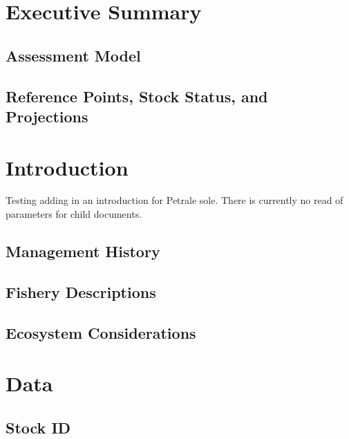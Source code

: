 \documentclass[
]{scrartcl}
\begin{document}
\newpage{}

\section{Executive Summary}\label{executive-summary}

\subsection{Assessment Model}\label{assessment-model}

\subsection{Reference Points, Stock Status, and
Projections}\label{reference-points-stock-status-and-projections}

\newpage{}

\section{Introduction}\label{introduction}

Testing adding in an introduction for Petrale sole. There is currently
no read of parameters for child documents.

\subsection{Management History}\label{management-history}

\subsection{Fishery Descriptions}\label{fishery-descriptions}

\subsection{Ecosystem Considerations}\label{ecosystem-considerations}

\newpage{}

\section{Data}\label{data}

\subsection{Stock ID}\label{stock-id}
\end{document}
